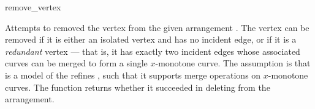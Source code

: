 \ccRefPageBegin

\begin{ccRefFunction}{remove_vertex}

\ccDefinition

Attempts to removed the vertex  from the given arrangement .
The vertex can be removed if it is either an isolated vertex and has no
incident edge, or if it is a {\sl redundant} vertex --- that is, it has
exactly two incident edges whose associated curves can be merged to form
a single $x$-monotone curve. The assumption is that  is a
model of the refines , such that it
supports merge operations on $x$-monotone curves.
The function returns whether it succeeded in deleting  from the
arrangement.



\end{ccRefFunction}

\ccRefPageEnd
